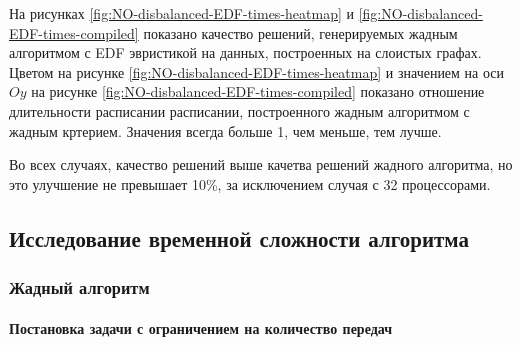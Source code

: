 На рисунках \ref{fig:NO-disbalanced-EDF-times-heatmap} и \ref{fig:NO-disbalanced-EDF-times-compiled} показано качество решений, генерируемых жадным алгоритмом с EDF эвристикой на данных, построенных на слоистых графах. Цветом на рисунке \ref{fig:NO-disbalanced-EDF-times-heatmap} и значением на оси $Oy$ на рисунке \ref{fig:NO-disbalanced-EDF-times-compiled} показано отношение длительности расписании расписании, построенного жадным алгоритмом с жадным кртерием. Значения всегда больше 1, чем меньше, тем лучше.

Во всех случаях, качество решений выше качетва решений жадного алгоритма, но это улучшение не превышает 10\%, за исключением случая с 32 процессорами.

\subsection{Исследование временной сложности алгоритма}

\subsubsection{Жадный алгоритм}

\paragraph{Постановка задачи с ограничением на количество передач}

